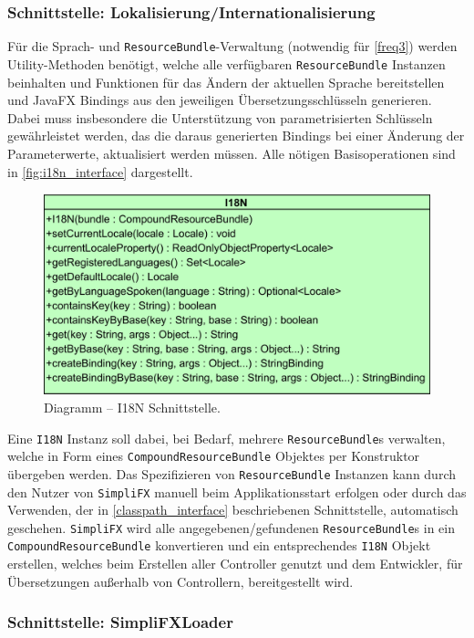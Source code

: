 \subsubsection{Schnittstelle: Lokalisierung/Internationalisierung}
Für die Sprach- und \texttt{ResourceBundle}-Verwaltung (notwendig für \autoref{freq3}) werden Utility-Methoden benötigt, welche alle verfügbaren \texttt{ResourceBundle} Instanzen beinhalten und Funktionen für das Ändern der aktuellen Sprache bereitstellen und JavaFX Bindings aus den jeweiligen Übersetzungsschlüsseln generieren. Dabei muss insbesondere die Unterstützung von parametrisierten Schlüsseln gewährleistet werden, das die daraus generierten Bindings bei einer Änderung der Parameterwerte, aktualisiert werden müssen. Alle nötigen Basisoperationen sind in \autoref{fig:i18n_interface} dargestellt.
\begin{figure}[H]
	\centering
	\includegraphics[width=\textwidth-2cm]{Abbildungen/I18N.png}
	\caption{Diagramm -- I18N Schnittstelle.}
	\label{fig:i18n_interface}
\end{figure}
\noindent Eine \texttt{I18N} Instanz soll dabei, bei Bedarf, mehrere \texttt{ResourceBundle}s verwalten, welche in Form eines \texttt{CompoundResourceBundle} Objektes per Konstruktor übergeben werden. Das Spezifizieren von \texttt{ResourceBundle} Instanzen kann durch den Nutzer von \texttt{SimpliFX} manuell beim Applikationsstart erfolgen oder durch das Verwenden, der in \autoref{classpath_interface} beschriebenen Schnittstelle, automatisch geschehen. \texttt{SimpliFX} wird alle angegebenen/gefundenen \texttt{ResourceBundle}s in ein \texttt{CompoundResourceBundle} konvertieren und ein entsprechendes \texttt{I18N} Objekt erstellen, welches beim Erstellen aller Controller genutzt und dem Entwickler, für Übersetzungen außerhalb von Controllern, bereitgestellt wird.
\subsubsection{Schnittstelle: SimpliFXLoader}

